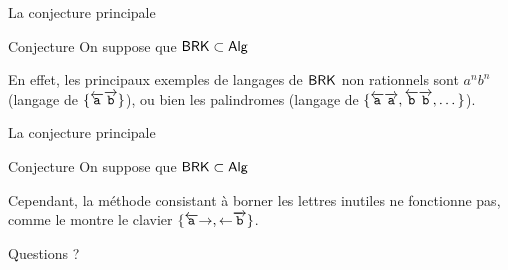 \documentclass[11pt,french,professionalfonts]{beamer}
\begin{document}
\begin{frame}{La conjecture principale}
	\begin{alertblock}{Conjecture}
		On suppose que $\mathsf{BRK} \subset \mathsf{Alg}$
	\end{alertblock}
	En effet, les principaux exemples de langages de $\mathsf{BRK}$ non rationnels sont $a^nb^n$ (langage de $\{\overleftarrow{\mathtt{a}}\overrightarrow{\mathtt{b}}\}$), ou bien les palindromes (langage de $\{\overleftarrow{\mathtt{a}}\overrightarrow{\mathtt{a}},\overleftarrow{\mathtt{b}}\overrightarrow{\mathtt{b}}, \dots\}$).
\end{frame}
\begin{frame}{La conjecture principale}
	\begin{alertblock}{Conjecture}
		On suppose que $\mathsf{BRK} \subset \mathsf{Alg}$
	\end{alertblock}
	Cependant, la méthode consistant à borner les lettres inutiles ne fonctionne pas, comme le montre le clavier $\{\overleftarrow{\mathtt{a}}\mathord{\rightarrow},\mathord{\leftarrow}\overrightarrow{\mathtt{b}}\}$.
\end{frame}

\begin{frame}[standout]
	Questions ?
\end{frame}
\end{document}
